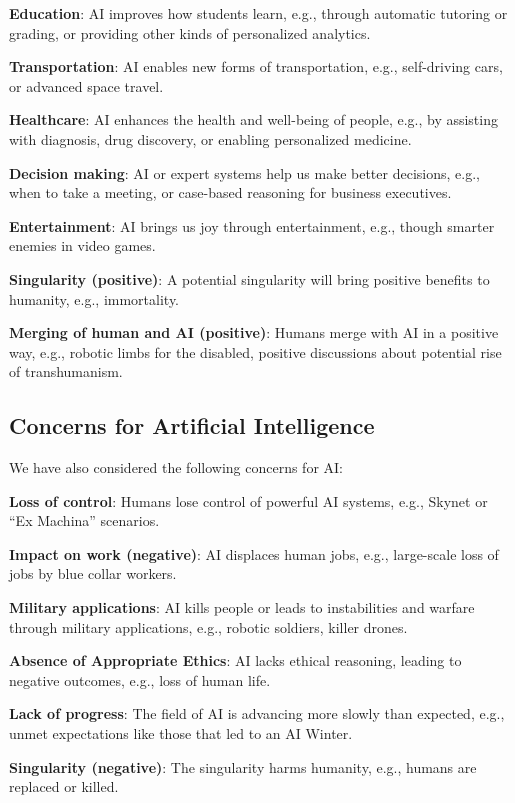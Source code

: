 \documentclass[letterpaper]{article}
\begin{document}
\textbf{Education}: AI improves how students learn, e.g., through automatic tutoring or grading, or providing other kinds of personalized analytics.

\textbf{Transportation}: AI enables new forms of transportation, e.g., self-driving cars, or advanced space travel.

\textbf{Healthcare}: AI enhances the health and well-being of people, e.g., by assisting with diagnosis, drug discovery, or enabling personalized medicine.

\textbf{Decision making}: AI or expert systems help us make better decisions, e.g., when to take a meeting, or case-based reasoning for business executives.

\textbf{Entertainment}: AI brings us joy through entertainment, e.g., though smarter enemies in video games.

\textbf{Singularity (positive)}: A potential singularity will bring positive benefits to humanity, e.g., immortality.

\textbf{Merging of human and AI (positive)}: Humans merge with AI in a positive way, e.g., robotic limbs for the disabled, positive discussions about potential rise of transhumanism.

\subsection{Concerns for Artificial Intelligence}

We have also considered the following concerns for AI:

\textbf{Loss of control}: Humans lose control of powerful AI systems, e.g., Skynet or ``Ex Machina'' scenarios.

\textbf{Impact on work (negative)}: AI displaces human jobs, e.g., large-scale loss of jobs by blue collar workers.

\textbf{Military applications}: AI kills people or leads to instabilities and warfare through military applications, e.g., robotic soldiers, killer drones.

\textbf{Absence of Appropriate Ethics}: AI lacks ethical reasoning, leading to negative outcomes, e.g., loss of human life.

\textbf{Lack of progress}: The field of AI is advancing more slowly than expected, e.g., unmet expectations like those that led to an AI Winter.

\textbf{Singularity (negative)}: The singularity harms humanity, e.g., humans are replaced or killed.
\end{document}
